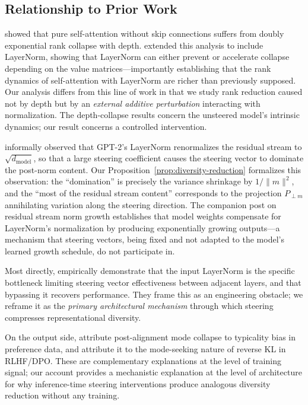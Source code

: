 \subsection{Relationship to Prior Work}

\citet{dong2021attention} showed that pure self-attention without skip connections suffers from doubly exponential rank collapse with depth.
\citet{wu2024role} extended this analysis to include LayerNorm, showing that LayerNorm can either prevent or accelerate collapse depending on the value matrices---importantly establishing that the rank dynamics of self-attention with LayerNorm are richer than previously supposed.
Our analysis differs from this line of work in that we study rank reduction caused not by depth but by an \emph{external additive perturbation} interacting with normalization.
The depth-collapse results concern the unsteered model's intrinsic dynamics; our result concerns a controlled intervention.

\citet{turntrout2023steering} informally observed that GPT-2's LayerNorm renormalizes the residual stream to $\sqrt{d_{\mathrm{model}}}$, so that a large steering coefficient causes the steering vector to dominate the post-norm content.
Our Proposition~\ref{prop:diversity-reduction} formalizes this observation: the ``domination'' is precisely the variance shrinkage by $1/\|m\|^2$, and the ``most of the residual stream content'' corresponds to the projection $P_{\perp m}$ annihilating variation along the steering direction.
The companion post on residual stream norm growth \citep{turntrout2023norms} establishes that model weights compensate for LayerNorm's normalization by producing exponentially growing outputs---a mechanism that steering vectors, being fixed and not adapted to the model's learned growth schedule, do not participate in.

Most directly, \citet{sinii2025small} empirically demonstrate that the input LayerNorm is the specific bottleneck limiting steering vector effectiveness between adjacent layers, and that bypassing it recovers performance.
They frame this as an engineering obstacle; we reframe it as the \emph{primary architectural mechanism} through which steering compresses representational diversity.

On the output side, \citet{zhang2025verbalized} attribute post-alignment mode collapse to typicality bias in preference data, and \citet{omahony2024attributing} attribute it to the mode-seeking nature of reverse KL in RLHF/DPO.
These are complementary explanations at the level of training signal; our account provides a mechanistic explanation at the level of architecture for why inference-time steering interventions produce analogous diversity reduction without any training.
